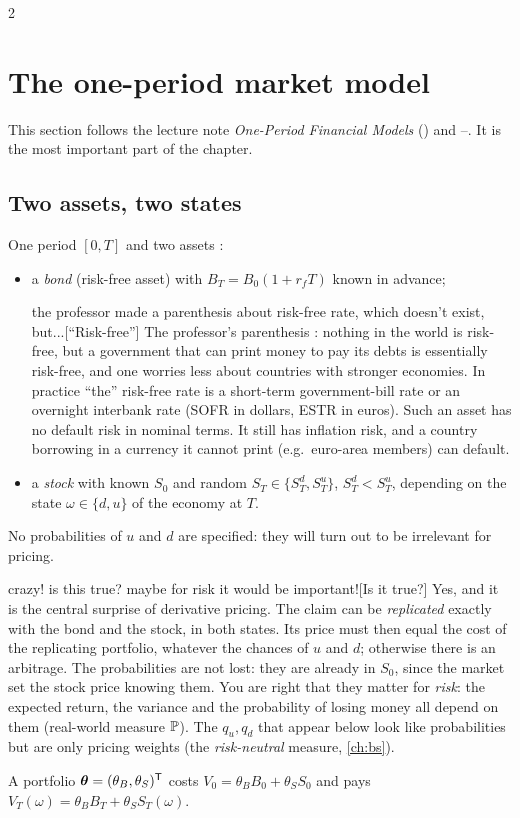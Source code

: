 \begin{paracol}{2}
\section{The one-period market model}\label{sec:oneperiod}
This section follows the lecture note \emph{One-Period Financial Models} () and
--. It is the most important part of the chapter.

\subsection{Two assets, two states}\label{sec:binomial}
One period $[0,T]$ and two assets :
\begin{itemize}
  \item a \emph{bond} (risk-free asset) with $B_T = B_0(1+r_fT)$ known in advance;\begin{answer}{the professor made a parenthesis about risk-free rate, which doesn't exist, but...}[``Risk-free'']
The professor's parenthesis : nothing in the world is risk-free, but a
government that can print money to pay its debts is essentially risk-free, and one worries less about
countries with stronger economies. In practice ``the'' risk-free rate is a short-term
government-bill rate or an overnight interbank rate (SOFR in dollars, ESTR in euros). Such an asset
has no default risk in nominal terms. It still has inflation risk, and a country borrowing in a
currency it cannot print (e.g.\ euro-area members) can default.
\end{answer}
  \item a \emph{stock} with known $S_0$ and random $S_T\in\{S_T^d, S_T^u\}$, $S_T^d<S_T^u$, depending on
        the state $\omega\in\{d,u\}$ of the economy at $T$.
\end{itemize}
No probabilities of $u$ and $d$ are specified: they will turn out to be irrelevant for pricing. \begin{answer}{crazy! is this true? maybe for risk it would be important!}[Is it true?]
Yes, and it is the central surprise of derivative pricing. The
claim can be \emph{replicated} exactly with the bond and the stock, in both states. Its price must
then equal the cost of the replicating portfolio, whatever the chances of $u$ and $d$; otherwise
there is an arbitrage. The probabilities are not lost: they are already in $S_0$, since the market set
the stock price knowing them.
You are right that they matter for \emph{risk}: the expected return,
the variance and the probability of losing money all depend on them (real-world measure $\mathbb{P}$). The
$q_u,q_d$ that appear below look like probabilities but are only pricing weights (the
\emph{risk-neutral} measure, \cref{ch:bs}).
\end{answer}
A portfolio $\bm\theta=(\theta_B,\theta_S)^{\mathsf T}$ costs $V_0=\theta_BB_0+\theta_SS_0$ and pays
$V_T(\omega)=\theta_BB_T+\theta_SS_T(\omega)$.


\end{paracol}
